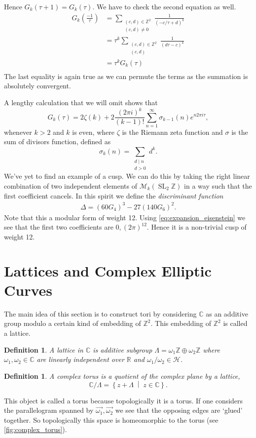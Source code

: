 \documentclass[titlepage,a4paper]{article}
\theoremstyle{theoremdd}
\theoremstyle{definitiondd}
\newtheorem{definition}[theorem]{Definition}
\theoremstyle{remarkdd}
\newcommand{\Z}{\mathbb{Z}}
\newcommand{\C}{\mathbb{C}}
\newcommand{\R}{\mathbb{R}}
\newcommand{\bigset}[2]{ \left\{ #1 \;\middle|\; #2 \right\} }
\DeclareMathOperator{\SL}{SL}
\begin{document}
Hence $G_k(\tau + 1) = G_k(\tau)$.
We have to check the second equation as well.
\begin{align*}
	G_k\left(\frac{-1}{\tau}\right) &=  \sum_{\substack{(c,d) \in \Z^2 \\ (c,d) \ne 0}} \frac{1}{(-c / \tau + d)^{k}}\\
			     &= \tau^{k} \sum_{\substack{(c, d) \in \Z^2 \\ (c,d)}} \frac{1}{(d \tau - c)^{k}} \\
			     &= \tau^{k}G_k(\tau) \\
\end{align*}
The last equality is again true as we can permute the terms as the summation is absolutely convergent.

A lengthy calculation that we will omit shows that \begin{equation}\label{eq:expansion_eisenstein}
	G_k(\tau) = 2 \zeta(k) + 2 \frac{(2\pi i)^{k}}{(k-1)!}\sum_{n = 1}^{\infty} \sigma_{k-1}(n)  e^{n 2 \pi i \tau}
,\end{equation}
whenever $ k>2$ and $k$ is even, where $\zeta$ is the Riemann zeta function and $\sigma$ is the sum of divisors function, defined as
\[
	\sigma_{k}(n) = \sum_{\substack{d \mathbin | n \\ d > 0}} d^{k}
.\] 
We've yet to find an example of a cusp. We can do this by taking the right linear combination of two independent elements of $\mathcal{M} _k(\SL_2\Z)$ in a way such that the first coefficient cancels.
In this spirit we define the \emph{discriminant function}
\begin{align*}
	\Delta = (60 G_4)^3 - 27(140G_6)^2
.\end{align*}
Note that this a modular form of weight 12. 
Using \cref{eq:expansion_eisenstein} we see that the first two coefficients are $0, (2 \pi)^{12}$. 
Hence it is a non-trivial cusp of weight 12. 

\section{Lattices and Complex Elliptic Curves}
The main idea of this section is to construct tori by considering $\C$ as an additive group modulo a certain kind of embedding of $\Z^2$. This embedding of $\Z^2$ is called a lattice.  
\begin{definition}
	A \emph{lattice in $\C$} is additive subgroup $\Lambda = \omega_1 \Z \oplus \omega_2 \Z$ where $\omega_1, \omega_2 \in \C$ are linearly independent over $\R$ and $\omega_1 / \omega_2  \in \mathcal{H}$.
\end{definition}
\begin{definition}
	A \emph{complex torus} is a quotient of the complex plane by a lattice, \[
		\C / \Lambda = \bigset{z + \Lambda}{z \in \C} 
	.\] 
\end{definition}
This object is called a torus because topologically it is a torus. 
If one considers the parallelogram spanned by $\vec{\omega_1}, \vec{\omega_2}$ we see that the opposing edges are `glued' together. 
So topologically this space is homeomorphic to the torus (see \cref{fig:complex_torus}). 
\end{document}
